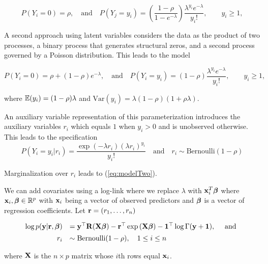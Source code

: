 \documentclass[times, doublespace]{anzsauth}
\begin{document}
$$
P(Y_i = 0) = \rho, 
\quad \mbox{and} \quad 
P(Y_j = y_i) = \left( \frac{1 - \rho}{1 - e^{-\lambda}} \right) \frac{\lambda^{y_i} e^{-\lambda}} {y_i!},\qquad y_i \ge 1,
$$


\noindent A second approach using latent variables considers the data as the product of two processes, a
binary process that generates structural zeros, and a second process governed by a Poisson distribution. This
leads to the model

\begin{equation}\label{eq:modelTwo}
	P(Y_i = 0) = \rho + (1 - \rho) e^{-\lambda}, 
	\quad \mbox{and} \quad 
	P(Y_i = y_i) = (1 - \rho) \frac{\lambda^{y_i} e^{-\lambda}} {y_i!},\qquad y_i \ge 1,
\end{equation}

\noindent where ${\mathbb E}(y_i) = (1 - \rho)\lambda$ 
and $\mbox{Var}(y_i) =  \lambda(1 - \rho)(1 + \rho\lambda)$.

\noindent An auxiliary variable representation of this parameterization introduces the auxiliary
variables $r_i$ which equals $1$ when $y_i>0$ and is unobserved otherwise. This leads to the
specification 
$$
P(Y_i=y_i|r_i) = \frac{\exp(-\lambda r_i)(\lambda r_i)^{y_i}}{y_i!} \quad \mbox{and} \quad r_i \sim \mbox{Bernoulli}(1-\rho)
$$

\noindent Marginalization over $r_i$ leads to (\ref{eq:modelTwo}).

\noindent We can add covariates using a log-link where we replace $\lambda$ with ${\bf x}_i^T{\boldsymbol \beta}$ where
${\bf x}_i,{\boldsymbol \beta}\in{\mathbb R}^p$ with ${\bf x}_i$ being a vector of observed predictors and ${\boldsymbol \beta}$ is 
a vector of regression coefficients. Let ${\bf r} = (r_1,\ldots,r_n)$
 
\begin{equation}%
	\begin{array}{rl}
		\log p(\vy|\vr, \vbeta) 
		    & = \vy^\top \mR (\mX\vbeta)                           
		- \vr^\top \exp{(\mX\vbeta)} 
		- \vone^\top \log{\Gamma{(\vy + \vone)}}, \quad \mbox{ and }\\ [1ex]
		r_i & \sim \text{Bernoulli}(1-\rho), \quad 1 \leq i \leq n \\
	\end{array}
\end{equation} 

\noindent where ${\bf X}$ is the $n\times p$ matrix whose $i$th rows equal ${\bf x}_i$.
\end{document}
